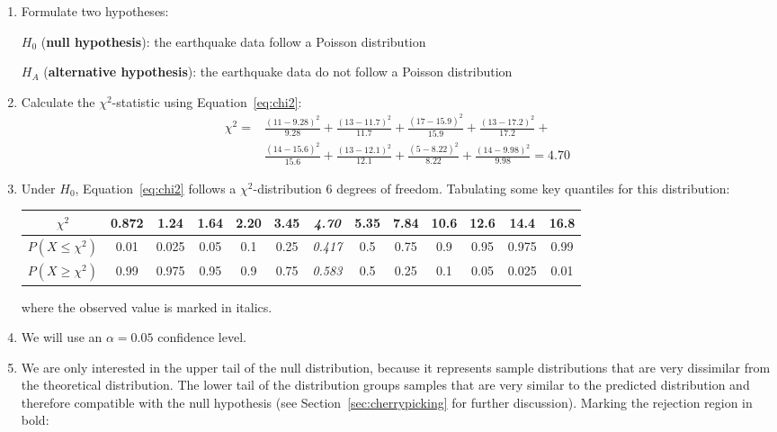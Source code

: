 \begin{enumerate}
\item  Formulate two hypotheses:

  $H_0$ (\textbf{null hypothesis}):
  the earthquake data follow a Poisson distribution

  $H_{\!A}$ (\textbf{alternative hypothesis}):
  the earthquake data do not follow a Poisson distribution
  
\item Calculate the $\chi^2$-statistic using Equation~\ref{eq:chi2}:
  \begin{equation}
    \begin{split}
      \chi^2 = &
      \frac{(11-9.28)^2}{9.28} + \frac{(13-11.7)^2}{11.7} +
      \frac{(17-15.9)^2}{15.9} + \frac{(13-17.2)^2}{17.2} + \\
      & \frac{(14-15.6)^2}{15.6} + \frac{(13-12.1)^2}{12.1} +
      \frac{(5-8.22)^2}{8.22} + \frac{(14-9.98)^2}{9.98} = 4.70
    \end{split}
  \end{equation}

\item Under $H_0$, Equation~\ref{eq:chi2} follows a
  $\chi^2$-distribution 6 degrees of freedom. Tabulating some key
  quantiles for this distribution:

  \begin{center}
    \begin{tabular}{c|c@{\gap}c@{\gap}c@{\gap}c@{\gap}
        c@{\gap}c@{\gap}c@{\gap}c@{\gap}c@{\gap}c@{\gap}c@{\gap}c}
      $\chi^2$ & 0.872 & 1.24 & 1.64 & 2.20 & 3.45 & \textit{4.70} &
      5.35 & 7.84 & 10.6 & 12.6 & 14.4 & 16.8 \\ \hline
      $P(X\leq{\chi^2})$ & 0.01 & 0.025 & 0.05 & 0.1 & 0.25 &
      \textit{0.417} & 0.5 & 0.75 & 0.9 & 0.95 & 0.975 & 0.99 \\
      $P(X\geq{\chi^2})$ & 0.99 & 0.975 & 0.95 & 0.9 & 0.75 &
      \textit{0.583} & 0.5 & 0.25 & 0.1 & 0.05 & 0.025 & 0.01
    \end{tabular}
  \end{center}

  \noindent where the observed value is marked in italics.
  
\item We will use an $\alpha = 0.05$ confidence level.

\item We are only interested in the upper tail of the null
  distribution, because it represents sample distributions that are
  very dissimilar from the theoretical distribution. The lower tail of
  the distribution groups samples that are very similar to the
  predicted distribution and therefore compatible with the null
  hypothesis (see Section~\ref{sec:cherrypicking} for further
  discussion). Marking the rejection region in bold:
  

\end{enumerate}

